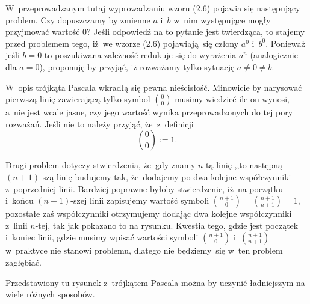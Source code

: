 \documentclass[a4paper,11pt]{article}
\begin{document}
\vspace{\spaceFour}





 W~przeprowadzanym tutaj wyprowadzaniu wzoru (2.6) pojawia się
następujący problem. Czy dopuszczamy by zmienne $a$ i~$b$ w~nim występujące
mogły przyjmować wartość $0$? Jeśli odpowiedź na to pytanie jest twierdząca,
to stajemy przed problemem tego, iż~we wzorze (2.6) pojawiają~się
człony $a^{ 0 }$ i~$b^{ 0 }$. Ponieważ jeśli $b = 0$ to poszukiwana zależność
redukuje się do wyrażenia $a^{ n }$ (analogicznie dla $a = 0$), proponuję by
przyjąć, iż rozważamy tylko sytuację $a \neq 0 \neq b$.

\vspace{\spaceFour}





 W~opis trójkąta Pascala wkradłą się pewna nieścisłość. Minowicie by
narysować pierwszą linię zawierającą tylko symbol $\binom{ 0 }{ 0 }$ musimy wiedzieć
ile on wynosi, a~nie jest wcale jasne, czy jego wartość wynika przeprowadzonych 
do tej pory rozważań. Jeśli nie to należy przyjąć, że~z~definicji
\begin{equation}
  \label{Gancarzewicz-Arytmetyka-03}
  \binom{ 0 }{ 0 } := 1.
\end{equation}

Drugi problem dotyczy stwierdzenia, że~gdy znamy $n$-tą linię ,,to następną $( n + 1 )$-szą linię
budujemy tak, że~dodajemy po dwa kolejne współczynniki z~poprzedniej linii. Bardziej poprawne byłoby
stwierdzenie, iż~na początku i~końcu $( n + 1 )$-szej linii zapisujemy wartość symboli 
$\binom{ n + 1 }{ 0 } = \binom{ n + 1 }{ n + 1 } = 1$, pozostałe zaś współczynniki otrzymujemy
dodając dwa kolejne współczynniki z~linii $n$-tej, tak jak pokazano to na rysunku. Kwestia tego,
gdzie jest początek i~koniec linii, gdzie musimy wpisać wartości symboli $\binom{ n + 1 }{ 0 }$ 
i~$\binom{ n + 1 }{ n + 1 }$ w~praktyce nie stanowi problemu, dlatego nie będziemy~się w~ten problem
zagłębiać.

\vspace{\spaceFour}





 Przedstawiony tu rysunek z~trójkątem Pascala można by uczynić ładniejszym na wiele różnych sposobów.

\vspace{\spaceFour}
\end{document}
